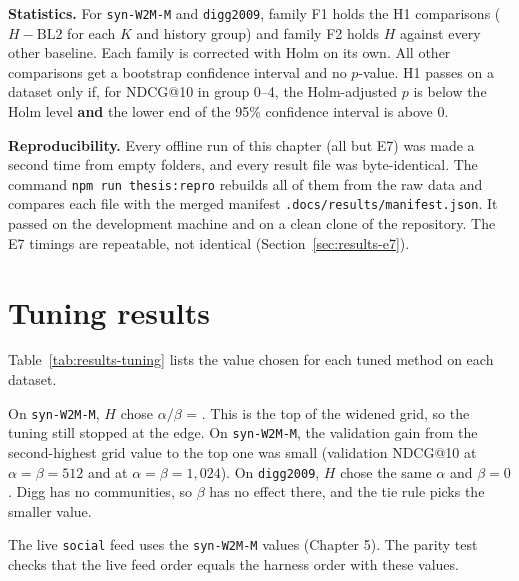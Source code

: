 \textbf{Statistics.} For \texttt{syn-W2M-M} and \texttt{digg2009}, family F1 holds the H1 comparisons ($H - \text{BL2}$ for each $K$ and history group) and family F2 holds $H$ against every other baseline. Each family is corrected with Holm on its own. All other comparisons get a bootstrap confidence interval and no $p$-value. H1 passes on a dataset only if, for NDCG@10 in group 0--4, the Holm-adjusted $p$ is below the Holm level \textbf{and} the lower end of the 95\% confidence interval is above 0.

\textbf{Reproducibility.} Every offline run of this chapter (all but E7) was made a second time from empty folders, and every result file was byte-identical. The command \texttt{npm run thesis:repro} rebuilds all of them from the raw data and compares each file with the merged manifest \texttt{.docs/results/manifest.json}. It passed on the development machine and on a clean clone of the repository. The E7 timings are repeatable, not identical (Section~\ref{sec:results-e7}).

\section{Tuning results}
\label{sec:results-tuning}

Table~\ref{tab:results-tuning} lists the value chosen for each tuned method on each dataset.

\begin{table}[htbp]
  \centering
  \caption{Values chosen on the validation split for each tuned method (the highest validation NDCG@10; a tie goes to the smaller value).}
  \label{tab:results-tuning}
  \small
  
\end{table}

On \texttt{syn-W2M-M}, $H$ chose $\alpha / \beta$ = \tuneWTwoMHChosen{}. This is the top of the widened grid, so the tuning still stopped at the edge. On \texttt{syn-W2M-M}, the validation gain from the second-highest grid value to the top one was small (validation NDCG@10 \tuneWTwoMHValNdcgTenFiveTwelveFull{} at $\alpha = \beta = 512$ and \tuneWTwoMHValNdcgTenTenTwentyFourFull{} at $\alpha = \beta = 1{,}024$). On \texttt{digg2009}, $H$ chose the same $\alpha$ and $\beta = 0$. Digg has no communities, so $\beta$ has no effect there, and the tie rule picks the smaller value.

The live \texttt{social} feed uses the \texttt{syn-W2M-M} values (Chapter 5). The parity test checks that the live feed order equals the harness order with these values.

